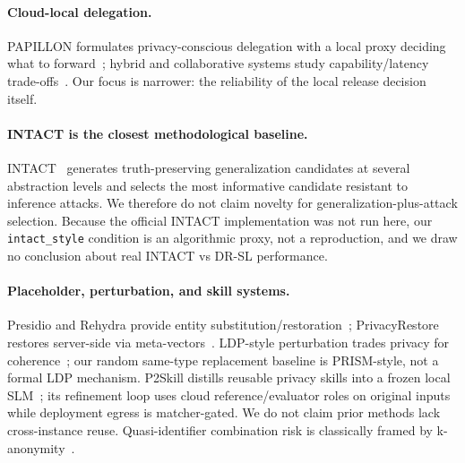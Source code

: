 \documentclass[journal]{IEEEtran}
\begin{document}
\paragraph{Cloud-local delegation.} PAPILLON formulates privacy-conscious delegation with a local proxy deciding what to forward~\cite{siyan2025papillon}; hybrid and collaborative systems study capability/latency trade-offs~\cite{hao2024hybrid,jin2025cecollm,li2025collab}. Our focus is narrower: the reliability of the local release decision itself.

\paragraph{INTACT is the closest methodological baseline.} INTACT~\cite{pilan2025truthful} generates truth-preserving generalization candidates at several abstraction levels and selects the most informative candidate resistant to inference attacks. We therefore do not claim novelty for generalization-plus-attack selection. Because the official INTACT implementation was not run here, our \texttt{intact\_style} condition is an algorithmic proxy, not a reproduction, and we draw no conclusion about real INTACT vs DR-SL performance.

\paragraph{Placeholder, perturbation, and skill systems.} Presidio and Rehydra provide entity substitution/restoration~\cite{presidio,rehydra}; PrivacyRestore restores server-side via meta-vectors~\cite{zeng2025privacyrestore}. LDP-style perturbation trades privacy for coherence~\cite{mai2023split,shi2022selective,duchi2013local,yue2021santext}; our random same-type replacement baseline is PRISM-style, not a formal LDP mechanism. P2Skill distills reusable privacy skills into a frozen local SLM~\cite{ryu2026p2skill}; its refinement loop uses cloud reference/evaluator roles on original inputs while deployment egress is matcher-gated. We do not claim prior methods lack cross-instance reuse. Quasi-identifier combination risk is classically framed by k-anonymity~\cite{sweeney2002k}.
\end{document}
